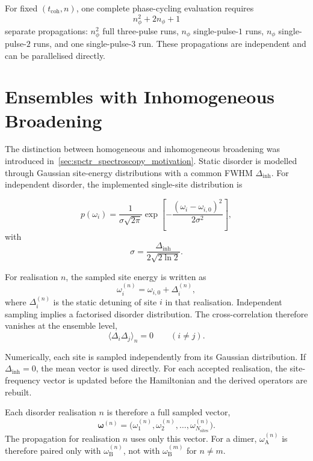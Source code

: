 For fixed \((t_{\mathrm{coh}},n)\), one complete phase-cycling evaluation requires
\begin{equation*}
n_{\phi}^2 + 2n_{\phi} + 1
\end{equation*}
separate propagations: \(n_{\phi}^2\) full three-pulse runs, \(n_{\phi}\) single-pulse-\(1\) runs, \(n_{\phi}\) single-pulse-\(2\) runs, and one single-pulse-\(3\) run. These propagations are independent and can be parallelised directly.

\section{Ensembles with Inhomogeneous Broadening}
\label{app:sec:inhomogeneous_broadening}
The distinction between homogeneous and inhomogeneous broadening was introduced
in~\cref{sec:spctr_spectroscopy_motivation}.
Static disorder is modelled through Gaussian site-energy distributions with
a common FWHM \(\Delta_{\mathrm{inh}}\).
For independent disorder, the implemented single-site distribution is

\begin{equation*}
p(\omega_i)=
\frac{1}{\sigma\sqrt{2\pi}}
\exp\!\left[
-\frac{(\omega_i-\omega_{i,0})^2}{2\sigma^2}
\right],
\end{equation*}
with
\begin{equation*}
\sigma=\frac{\Delta_{\mathrm{inh}}}{2\sqrt{2\ln 2}}.
\end{equation*}

For realisation \(n\), the sampled site energy is written as
\begin{equation*}
\omega_i^{(n)}=\omega_{i,0}+\Delta_i^{(n)},
\end{equation*}
where \(\Delta_i^{(n)}\) is the static detuning of site \(i\) in that
realisation.
Independent sampling implies a factorised disorder distribution. The
cross-correlation therefore vanishes at the ensemble level,
\begin{equation*}
\langle \Delta_i \Delta_j\rangle_n = 0 \qquad (i\neq j).
\end{equation*}

Numerically, each site is sampled independently from its Gaussian
distribution.
If \(\Delta_{\mathrm{inh}}=0\), the mean vector is used
directly.
For each accepted realisation, the site-frequency vector is updated before
the Hamiltonian and the derived operators are rebuilt.

Each disorder realisation \(n\) is therefore a full sampled vector,
\begin{equation*}
\boldsymbol{\omega}^{(n)}=
\bigl(\omega_1^{(n)},\omega_2^{(n)},\ldots,\omega_{N_{\mathrm{sites}}}^{(n)}\bigr).
\end{equation*}
The propagation for realisation \(n\) uses only this vector.
For a dimer, \(\omega_{\mathrm{A}}^{(n)}\) is therefore paired only with
\(\omega_{\mathrm{B}}^{(n)}\), not with \(\omega_{\mathrm{B}}^{(m)}\) for \(n\neq m\).

